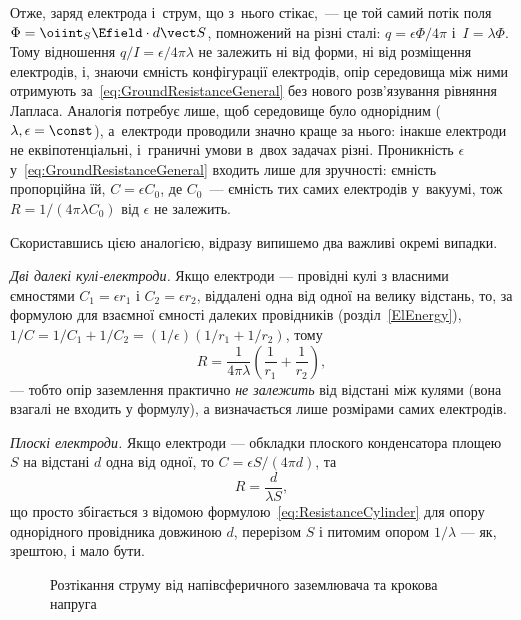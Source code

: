 Отже, заряд електрода і~струм, що з~нього стікає,~--- це той самий потік поля
$\Phi = \oiint_S\Efield\cdot d\vect S$, помножений на різні сталі: $q = \epsilon\Phi/4\pi$
і~$I = \lambda\Phi$. Тому відношення $q/I = \epsilon/4\pi\lambda$ не залежить ні від форми, ні
від розміщення електродів, і, знаючи ємність конфігурації електродів, опір середовища між ними
отримують за~\eqref{eq:GroundResistanceGeneral} без нового розв'язування рівняння Лапласа.
Аналогія потребує лише, щоб середовище було однорідним ($\lambda,\epsilon = \const$), а~електроди
проводили значно краще за нього: інакше електроди не еквіпотенціальні, і~граничні умови в~двох
задачах різні. Проникність $\epsilon$ у~\eqref{eq:GroundResistanceGeneral} входить лише для зручності: ємність
пропорційна їй, $C = \epsilon C_0$, де $C_0$~--- ємність тих самих електродів у~вакуумі, тож $R = 1/(4\pi\lambda C_0)$ від
$\epsilon$ не залежить.

Скориставшись цією аналогією, відразу випишемо два важливі окремі випадки.

\emph{Дві далекі кулі-електроди.} Якщо електроди --- провідні кулі з власними ємностями $C_1 = \epsilon r_1$ і $C_2 = \epsilon r_2$, віддалені
одна від одної на велику відстань, то, за формулою для взаємної ємності далеких провідників (розділ~\ref{ElEnergy}),
$1/C = 1/C_1 + 1/C_2 = (1/\epsilon)(1/r_1+1/r_2)$, тому
\begin{equation}\label{eq:GroundResistanceTwoElectrodes}
	R = \frac1{4\pi\lambda}\left(\frac1{r_1}+\frac1{r_2}\right),
\end{equation}
--- тобто опір заземлення практично \emph{не залежить} від відстані між кулями (вона взагалі не входить у формулу), а визначається лише розмірами
самих електродів.

\emph{Плоскі електроди.} Якщо електроди --- обкладки плоского конденсатора площею $S$ на відстані $d$ одна від одної, то $C = \epsilon S/(4\pi d)$, та
\begin{equation}\label{eq:GroundResistancePlates}
	R = \frac{d}{\lambda S},
\end{equation}
що просто збігається з відомою формулою~\eqref{eq:ResistanceCylinder} для опору однорідного провідника довжиною $d$, перерізом $S$ і питомим опором
$1/\lambda$ --- як, зрештою, і мало бути.

\begin{figure}[htbp]\centering
	\caption{Розтікання струму від напівсферичного заземлювача та крокова напруга\label{pic:StepVoltage}}
\end{figure}


